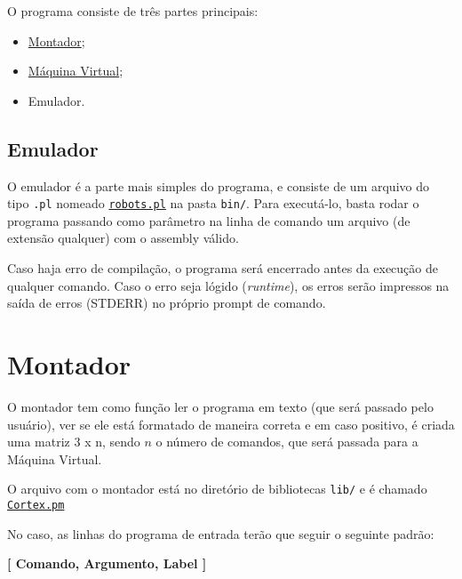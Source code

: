 \documentclass[a4paper]{article}
\begin{document}
        O programa consiste de três partes principais:
        \begin{itemize}
            \item \hyperref[sec:montador]        {Montador};
            \item \hyperref[sec:maquina_virtual] {Máquina Virtual};
            \item                                 Emulador.
        \end{itemize}
    
    \subsection{Emulador}
    
        O emulador é a parte mais simples do programa, e consiste de 
        um arquivo do tipo \texttt{.pl} nomeado 
        \href{run:../bin/robots.pl}{\texttt{robots.pl}} na pasta
        \texttt{bin/}. Para executá-lo, basta rodar o programa 
        passando como parâmetro na linha de comando um arquivo (de 
        extensão qualquer) com o assembly válido. 
        
        Caso haja erro de compilação, o programa será encerrado antes 
        da execução de qualquer comando. Caso o erro seja lógido 
        (\emph{runtime}), os erros serão impressos na saída de erros 
        (STDERR) no próprio prompt de comando.

\newpage %

\section{Montador} \label{sec:montador}

    O montador tem como função ler o programa em texto (que será 
    passado pelo usuário), ver se ele está formatado de maneira 
    correta e em caso positivo, é criada uma matriz 3 x n, sendo $n$ 
    o número de comandos, que será passada para a Máquina Virtual.
    
    O arquivo com o montador está no diretório de bibliotecas 
    \texttt{lib/} e é chamado \href{run:../lib/Cortex.pm}
    {\texttt{Cortex.pm}}
    
    \bigskip\bigskip
    
    No caso, as linhas do programa de entrada terão que seguir o 
    seguinte padrão:

    \begin{center}
        \textbf{[ Comando, Argumento, Label ]}
    \end{center}
    
\end{document}
